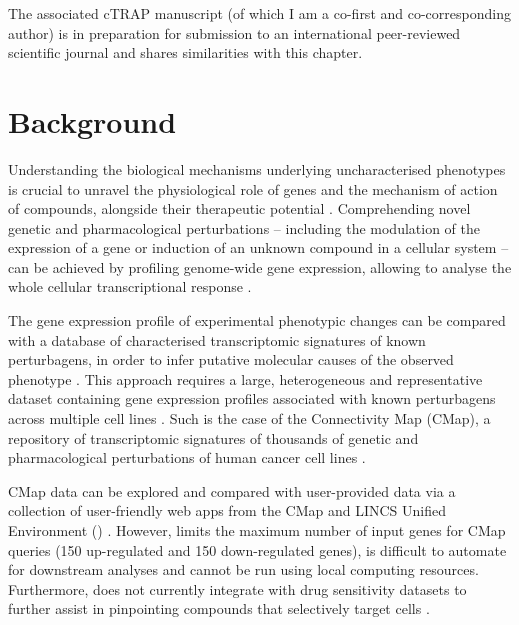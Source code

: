 The associated cTRAP manuscript (of which I am a co-first and co-corresponding author) is in preparation for submission to an international peer-reviewed scientific journal and shares similarities with this chapter.

\section{Background}

Understanding the biological mechanisms underlying uncharacterised phenotypes is crucial to unravel the physiological role of genes and the mechanism of action of compounds, alongside their therapeutic potential \cite{subramanian:2017ul,malta:2018uj,mendez-lucio:2020th,le:2021uq,hughes:2000ww,almeida:2019wh}. Comprehending novel genetic and pharmacological perturbations -- including the modulation of the expression of a gene or induction of an unknown compound in a cellular system -- can be achieved by profiling genome-wide gene expression, allowing to analyse the whole cellular transcriptional response \cite{hughes:2000ww}.

The gene expression profile of experimental phenotypic changes can be compared with a database of characterised transcriptomic signatures of known perturbagens, in order to infer putative molecular causes of the observed phenotype \cite{subramanian:2017ul,hughes:2000ww}. This approach requires a large, heterogeneous and representative dataset containing gene expression profiles associated with known perturbagens across multiple cell lines \cite{hughes:2000ww}. Such is the case of the Connectivity Map (CMap), a repository of transcriptomic signatures of thousands of genetic and pharmacological perturbations of human cancer cell lines \cite{subramanian:2017ul}. %

CMap data can be explored and compared with user-provided data via a collection of user-friendly web apps from the CMap and LINCS Unified Environment (\mbox{}) \cite{subramanian:2017ul}. However,  limits the maximum number of input genes for CMap queries (150 up-regulated and 150 down-regulated genes), %
is difficult to automate for downstream analyses and cannot be run using local computing resources. Furthermore,  does not currently integrate with drug sensitivity datasets to further assist in pinpointing compounds that selectively target cells \cite{almeida:2019wh}.

